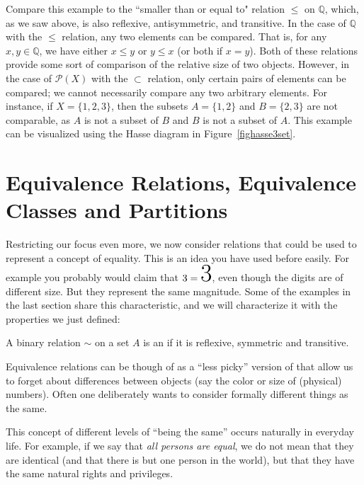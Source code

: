 Compare this example to the ``smaller than or equal to" relation $\leq$ on $\mathbb{Q}$, which, as we saw above, is also reflexive, antisymmetric, and transitive.
In the case of $\mathbb{Q}$ with the $\leq$ relation, any two elements can be compared.
That is, for any $x,y \in \mathbb{Q}$, we have either $x \leq y$ or $y \leq x$ (or both if $x=y$).
Both of these relations provide some sort of comparison of the relative size of two objects.
However, in the case of $\mathcal{P}(X)$ with the $\subset$ relation, only certain pairs of elements can be compared; we cannot necessarily compare any two arbitrary elements.
For instance, if $X = \{ 1,2,3 \}$, then the subsets $A = \{ 1,2 \}$ and $B = \{ 2,3 \}$ are not comparable, as $A$ is not a subset of $B$ and $B$ is not a subset of $A$.
This example can be visualized using the Hasse diagram in
Figure~\ref{fighasse3set}.

\section{Equivalence Relations, Equivalence Classes and Partitions}
\label{secequiv}

Restricting our focus even more,
we now consider relations that could be used to represent a concept of
equality. This is an idea
you have used before easily. For example you probably would
claim that $3=\mbox{\Huge 3}$, even though the digits are of different
size. But they represent the same magnitude. Some of the examples in the
last section share this characteristic, and we will characterize it with the
properties we just defined:
\begin{defn}
A binary relation $\sim$ on a set $A$ is an  if
it is reflexive, symmetric and transitive.
\end{defn}
Equivalence relations can be though of as a ``less picky'' version of
 that allow us to forget about differences between objects (say the
color or size  of (physical) numbers). Often one deliberately wants to
consider formally different things as the same.

This concept of different levels of ``being the same'' occurs naturally in
everyday life. For example, if we say that {\em all persons are equal}, we do not
mean that they are identical (and that there is but one person in the world), but
that they have the same natural rights and privileges.

